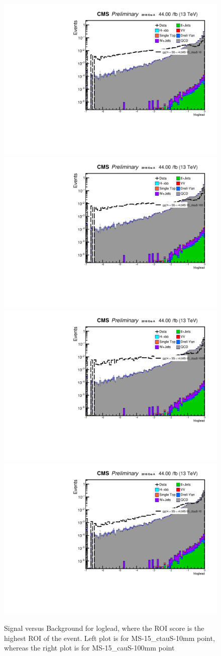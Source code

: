  \begin{figure}[h!]
   \caption{Signal versus Background for loglead, where the ROI score is the highest ROI of the event. Left plot is for MS-15\_ctauS-10mm point, whereas the right plot is for MS-15\_cauS-100mm point}
   \label{fig:leadROIscore}
   \centering
   \includegraphics[width=0.47\linewidth]{figs/log_AnalysisNote_MS-15_ctauS-10_hloglead.pdf}
   \includegraphics[width=0.47\linewidth]{figs/log_AnalysisNote_MS-15_ctauS-100_hloglead.pdf}
   \includegraphics[width=0.47\linewidth]{figs/log_AnalysisNote_MS-15_ctauS-1000_hloglead.pdf}
   \includegraphics[width=0.47\linewidth]{figs/log_AnalysisNote_MS-55_ctauS-10_hloglead.pdf}
 \end{figure}


